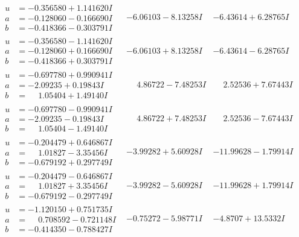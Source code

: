 \documentclass[1p]{elsarticle_modified}
\theoremstyle{definition}
\begin{document}
$$\begin{array}{c|c|c}
\begin{aligned}
u &= -0.356580 + 1.141620 I \\
a &= -0.128060 - 0.166690 I \\
b &= -0.418366 - 0.303791 I\end{aligned}
 & -6.06103 - 8.13258 I & -6.43614 + 6.28765 I \\ \hline\begin{aligned}
u &= -0.356580 - 1.141620 I \\
a &= -0.128060 + 0.166690 I \\
b &= -0.418366 + 0.303791 I\end{aligned}
 & -6.06103 + 8.13258 I & -6.43614 - 6.28765 I \\ \hline\begin{aligned}
u &= -0.697780 + 0.990941 I \\
a &= -2.09235 + 0.19843 I \\
b &= \phantom{-}1.05404 + 1.49140 I\end{aligned}
 & \phantom{-}4.86722 - 7.48253 I & \phantom{-}2.52536 + 7.67443 I \\ \hline\begin{aligned}
u &= -0.697780 - 0.990941 I \\
a &= -2.09235 - 0.19843 I \\
b &= \phantom{-}1.05404 - 1.49140 I\end{aligned}
 & \phantom{-}4.86722 + 7.48253 I & \phantom{-}2.52536 - 7.67443 I \\ \hline\begin{aligned}
u &= -0.204479 + 0.646867 I \\
a &= \phantom{-}1.01827 - 3.35456 I \\
b &= -0.679192 + 0.297749 I\end{aligned}
 & -3.99282 + 5.60928 I & -11.99628 - 1.79914 I \\ \hline\begin{aligned}
u &= -0.204479 - 0.646867 I \\
a &= \phantom{-}1.01827 + 3.35456 I \\
b &= -0.679192 - 0.297749 I\end{aligned}
 & -3.99282 - 5.60928 I & -11.99628 + 1.79914 I \\ \hline\begin{aligned}
u &= -1.120150 + 0.751735 I \\
a &= \phantom{-}0.708592 - 0.721148 I \\
b &= -0.414350 - 0.788427 I\end{aligned}
 & -0.75272 - 5.98771 I & -4.8707 + 13.5332 I \\ \hline\begin{aligned}

\end{aligned}
\end{array}$$
\end{document}
